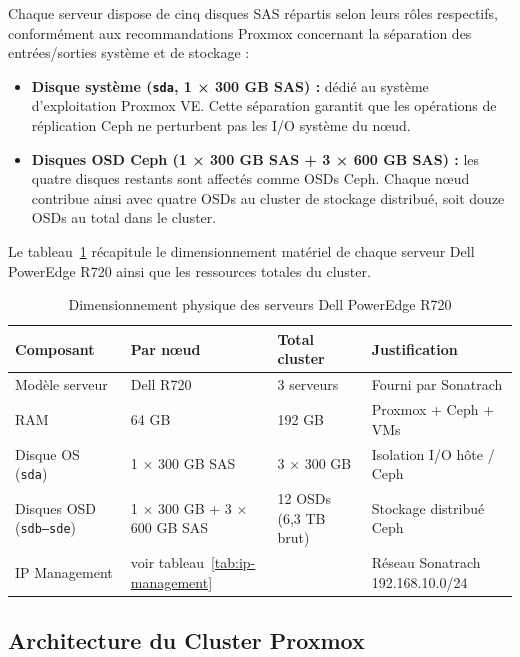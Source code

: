\par Chaque serveur dispose de cinq disques SAS répartis selon leurs rôles respectifs, conformément aux recommandations Proxmox concernant la séparation des entrées/sorties système et de stockage :\\

\begin{itemize}
    \item \textbf{Disque système (\texttt{sda}, 1 × 300 GB SAS) :} dédié au système d'exploitation Proxmox VE. Cette séparation garantit que les opérations de réplication Ceph ne perturbent pas les I/O système du nœud.
    \item \textbf{Disques OSD Ceph (1 × 300 GB SAS + 3 × 600 GB SAS) :} les quatre disques restants sont affectés comme OSDs Ceph. Chaque nœud contribue ainsi avec quatre OSDs au cluster de stockage distribué, soit douze OSDs au total dans le cluster.
\end{itemize}

\par Le tableau~\ref{tab:dim-r720} récapitule le dimensionnement matériel de chaque serveur Dell PowerEdge R720 ainsi que les ressources totales du cluster.\\

\begin{table}[H]
\centering
\caption{Dimensionnement physique des serveurs Dell PowerEdge R720}
\label{tab:dim-r720}
\begin{tabular}{|p{3.5cm}|p{3cm}|p{3cm}|p{4cm}|}
\hline
\textbf{Composant} & \textbf{Par nœud} & \textbf{Total cluster} & \textbf{Justification} \\
\hline
Modèle serveur & Dell R720 & 3 serveurs & Fourni par Sonatrach \\
\hline
RAM & 64 GB & 192 GB & Proxmox + Ceph + VMs \\
\hline
Disque OS (\texttt{sda}) & 1 × 300 GB SAS & 3 × 300 GB & Isolation I/O hôte / Ceph \\
\hline
Disques OSD (\texttt{sdb--sde}) & 1 × 300 GB + 3 × 600 GB SAS & 12 OSDs (6,3 TB brut) & Stockage distribué Ceph \\
\hline
IP Management & voir tableau~\ref{tab:ip-management} & & Réseau Sonatrach 192.168.10.0/24 \\
\hline
\end{tabular}
\end{table}

\subsection{Architecture du Cluster Proxmox}


